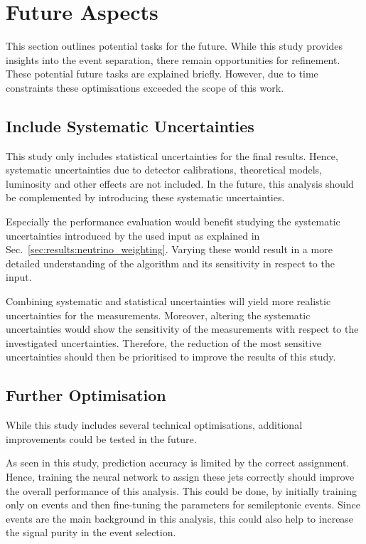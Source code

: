 \documentclass[bachelor,ngerman,english]{GAUBM}
\begin{document}
\section{Future Aspects}
\label{sec:discussion:future}
This section outlines potential tasks for the future. While this study provides insights into the \ttHWW event separation, there remain opportunities for refinement. These potential future tasks are explained briefly. However, due to time constraints these optimisations exceeded the scope of this work.

\subsection*{Include Systematic Uncertainties}
This study only includes statistical uncertainties for the final results. Hence, systematic uncertainties due to detector calibrations, theoretical models, luminosity and other effects are not included. In the future, this analysis should be complemented by introducing these systematic uncertainties. 

Especially the \NW performance evaluation would benefit studying the systematic uncertainties introduced by the used input as explained in Sec.~\ref{sec:results:neutrino_weighting}. Varying these would result in a more detailed understanding of the algorithm and its sensitivity in respect to the input.

Combining systematic and statistical uncertainties will yield more realistic uncertainties for the measurements. Moreover, altering the systematic uncertainties would show the sensitivity of the measurements with respect to the investigated uncertainties. Therefore, the reduction of the most sensitive uncertainties should then be prioritised to improve the results of this study. 

\subsection*{Further Optimisation}
While this study includes several technical optimisations, additional improvements could be tested in the future. 

As seen in this study, \spanets prediction accuracy is limited by the correct \ttbar assignment. Hence, training the neural network to assign these jets correctly should improve the overall performance of this analysis. This could be done, by initially training \spanet only on \ttbar events and then fine-tuning the parameters for semileptonic \ttHWW events. Since \ttbar events are the main background in this analysis, this could also help to increase the signal purity in the event selection. 
\end{document}
